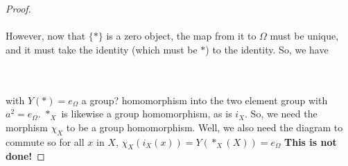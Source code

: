 \documentclass[12pt,letterpaper]{article}
\begin{document}
\begin{itemize}
\begin{proof}
\\\\
	However, now that $\{*\}$ is a zero object, the map from it to $\Omega$ must be unique, and it must take the identity (which must be $*$) to the identity. So, we have\\
	\\\\
		with $Y(*) = e_\Omega$ a group? homomorphism into the two element group with $a^2 = e_\Omega$. $*_X$ is likewise a group homomorphism, as is $i_X$. So, we need the morphism $\chi_X$ to be a group homomorphism. Well, we also need the diagram to commute so for all $x$ in $X$, $\chi_X(i_X(x)) = Y(*_X(X)) = e_\Omega$
		\textbf{This is not done!}
	\end{proof}
\end{itemize}


\pagebreak
\end{document}
